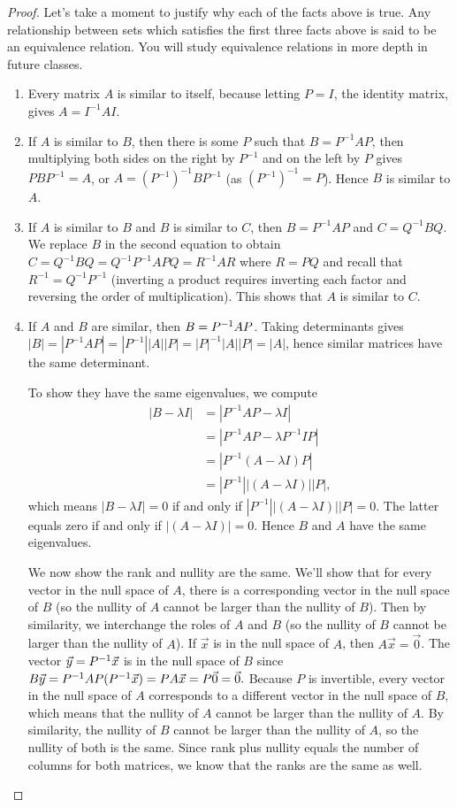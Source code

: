 \begin{proof} Let's take a moment to justify why each of the facts above is true.  Any relationship between sets which satisfies the first three facts above is said to be an equivalence relation.  You will study equivalence relations in more depth in future classes.
\begin{enumerate}
	\item Every matrix $A$ is similar to itself, because letting $P=I$, the identity matrix, gives $A=I^{-1}AI$. 
	\item If $A$ is similar to $B$, then there is some $P$ such that $B=P^{-1}AP$, then multiplying both sides on the right by $P^{-1}$ and on the left by $P$ gives $PBP^{-1}=A$, or $A = (P^{-1})^{-1}BP^{-1}$ (as $(P^{-1})^{-1}=P$). Hence $B$ is similar to $A$.  
	\item If $A$ is similar to $B$ and $B$ is similar to $C$, then $B=P^{-1}AP$ and $C=Q^{-1}BQ$.  We replace $B$ in the second equation to obtain $C=Q^{-1}BQ = Q^{-1}P^{-1}APQ = R^{-1}AR$ where $R=PQ$ and recall that $R^{-1} = Q^{-1}P^{-1}$ (inverting a product requires inverting each factor and reversing the order of multiplication). This shows that $A$ is similar to $C$.
	\item If $A$ and $B$ are similar, then $B=P^{-1} A P$. Taking determinants gives $|B|=|P^{-1}AP| = |P^{-1}||A||P| = |P|^{-1}|A||P| =|A|$, hence similar matrices have the same determinant. 
	
	To show they have the same eigenvalues, we compute 
	\begin{align*}
	|B-\lambda I|&=|P^{-1}AP-\lambda I|\\
	&=|P^{-1}AP-\lambda P^{-1}IP|\\
	&=|P^{-1}(A-\lambda I)P|\\
	&=|P^{-1}||(A-\lambda I)||P|,
	\end{align*} 
	which means $|B-\lambda I| = 0 $ if and only if $|P^{-1}||(A-\lambda I)||P|=0$. The latter equals zero if and only if $|(A-\lambda I)|=0$. Hence $B$ and $A$ have the same eigenvalues.
	
  We now show the rank and nullity are the same. We'll show that for every vector in the null space of $A$, there is a corresponding vector in the null space of $B$ (so the nullity of $A$ cannot be larger than the nullity of $B$).  Then by similarity, we interchange the roles of $A$ and $B$ (so the nullity of $B$ cannot be larger than the nullity of $A$). If $\vec x$ is in the null space of $A$, then $A\vec x = \vec 0$. The vector $\vec y = P^{-1} \vec x$ is in the null space of $B$ since $B\vec y = P^{-1} A P (P^{-1} \vec x) = P A \vec x = P\vec 0 = \vec 0.$ Because $P$ is invertible, every vector in the null space of $A$ corresponds to a different vector in the null space of $B$, which means that the nullity of $A$ cannot be larger than the nullity of $A$.  By similarity, the nullity of $B$ cannot be larger than the nullity of $A$, so the nullity of both is the same.  Since rank plus nullity equals the number of columns for both matrices, we know that the ranks are the same as well.     
\end{enumerate}
\end{proof}

